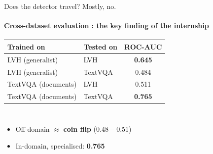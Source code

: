 \begin{frame}{Does the detector travel? Mostly, no.}
  \framesubtitle{Cross-dataset evaluation : the key finding of the internship}
  \begin{enslide}
  \centering
  {\small
  \begin{tabular}{@{}l l c@{}}
    \toprule
    \textbf{Trained on} & \textbf{Tested on} & \textbf{ROC-AUC} \\
    \midrule
    \rowcolor{AubaySuccess!14}
    LVH (generalist)   & LVH      & \textbf{0.645} \\
    LVH (generalist)   & TextVQA  & 0.484 \\
    TextVQA (documents) & LVH     & 0.511 \\
    \rowcolor{AubaySuccess!14}
    TextVQA (documents) & TextVQA & \textbf{0.765} \\
    \bottomrule
  \end{tabular}}
  \vspace{0.85cm}

  \begin{columns}[T,onlytextwidth]
      \begin{itemize}
        \item Off-domain $\approx$ \textbf{coin flip} (0.48 -- 0.51)
        \item In-domain, specialised: \textbf{0.765}
      \end{itemize}
  \end{columns}
  \end{enslide}
\end{frame}

